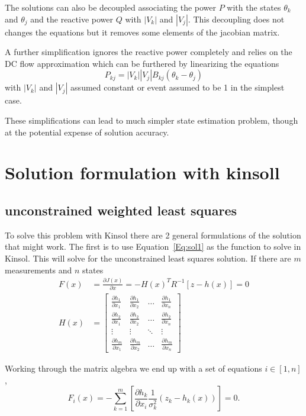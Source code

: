 \documentclass[11pt]{article} %
\newcommand{\pdiff}[2]{\frac{\partial #1}{\partial #2}}
\begin{document}
The solutions can also be decoupled associating the power $P$ with the states $\theta_k$ and $\theta_j$ and the reactive power $Q$ with $|V_k|$ and $|V_j|$.  This decoupling does not changes the equations but it removes some elements of the jacobian matrix.

A further simplification ignores the reactive power completely and relies on the DC flow approximation which can be furthered by linearizing the equations
\begin{equation}
P_{kj}=|V_k||V_j| B_{kj}(\theta_k-\theta_j)
\end{equation}
with $|V_k|$ and $|V_j|$ assumed constant or event assumed to be 1 in the simplest case.

These simplifications can lead to much simpler state estimation problem, though at the potential expense of solution accuracy.

\section{Solution formulation with kinsoll}
\subsection{unconstrained weighted least squares}

To solve this problem with Kinsol there are 2 general formulations of the solution that might work.  The first is to use Equation~\ref{Eq:sol1} as the function to solve in Kinsol.  This will solve for the unconstrained least squares solution.  If there are $m$ measurements and $n$ states
\begin{equation}
\begin{aligned}
F(x)&=\frac{\partial J(x)}{\partial x} = -H(x)^T R^{-1} \left[z-h(x)\right] = 0\\
H(x) &= \left[
\begin{matrix}
\pdiff{h_1}{x_1} & \pdiff{h_1}{x_2} & \hdots & \pdiff{h_1}{x_n} \\
\pdiff{h_2}{x_1} & \pdiff{h_2}{x_2} & \hdots & \pdiff{h_2}{x_n} \\
\vdots & \vdots & \ddots & \vdots \\
\pdiff{h_m}{x_1} & \pdiff{h_m}{x_2} & \hdots & \pdiff{h_m}{x_n}
\end{matrix}
\right]
\end{aligned}
\end{equation}

Working through the matrix algebra we end up with a set of equations $i \in [1,n]$,
\begin{equation}
F_i(x)=-\sum_{k=1}^m\left[\pdiff{h_k}{x_i}\frac{1}{\sigma_k^2}(z_k-h_k(x))\right]=0.
\end{equation}
\end{document}
